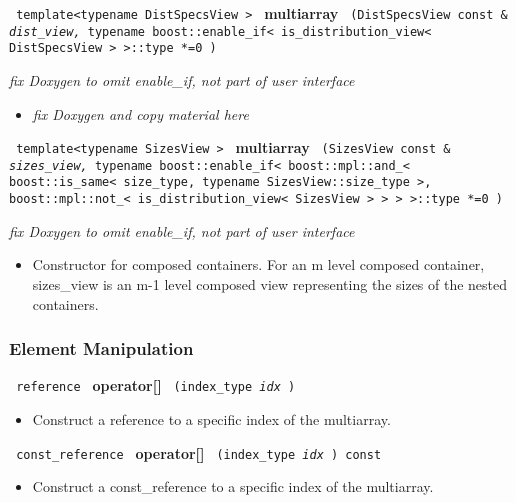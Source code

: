 \noindent
\texttt{%
template<typename DistSpecsView >
}
\newline
\textbf{multiarray}%
\texttt{%
(DistSpecsView const \&
\textit{dist\_view,}%
typename boost::enable\_if< is\_distribution\_view< DistSpecsView > >::type *=0
)
}

\vspace{0.4cm} \emph{fix Doxygen to omit enable\_if, not part of user interface}
 
\begin{itemize}
\item
\emph{fix Doxygen and copy material here}
\end{itemize}
 
\noindent
\texttt{%
template<typename SizesView >
}
\newline
\textbf{multiarray}%
\texttt{%
(SizesView const \&
\textit{sizes\_view,}%
typename boost::enable\_if< boost::mpl::and\_< boost::is\_same< size\_type, 
typename SizesView::size\_type >, 
boost::mpl::not\_< is\_distribution\_view< SizesView > > > >::type *=0
)
}

\vspace{0.4cm} \emph{fix Doxygen to omit enable\_if, not part of user interface}

\begin{itemize}
\item
Constructor for composed containers. For an m level composed container, sizes\_view is an m-1 level composed view representing the sizes of the nested containers. 
\end{itemize}

\subsubsection{Element Manipulation}

\noindent
\texttt{%
reference
}
\textbf{operator[]}%
\texttt{%
(index\_type 
\textit{idx}%
)
}

\begin{itemize}
\item
Construct a reference to a specific index of the multiarray.
\end{itemize}
 
\noindent%
\texttt{%
const\_reference
}
\textbf{operator[]}%
\texttt{%
(index\_type 
\textit{idx}%
) const
}

\begin{itemize}
\item
Construct a const\_reference to a specific index of the multiarray.
\end{itemize}
 
